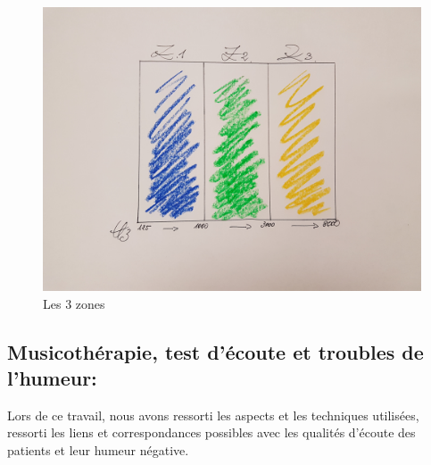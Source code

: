 \begin{figure}
	\centering
	\includegraphics[width=1\linewidth]{images/les3zones.jpg}
	\caption[Les 3 zones]{Les 3 zones}
	\label{Les trois zones du test d'écoute}
\end{figure}
 \clearpage

\subsection{Musicothérapie, test d'écoute et troubles de l'humeur:}
Lors de ce travail, nous avons ressorti les aspects 
et  les techniques utilisées, ressorti  les liens et 
correspondances possibles avec les qualités d'écoute des patients et leur humeur 
négative.  %

